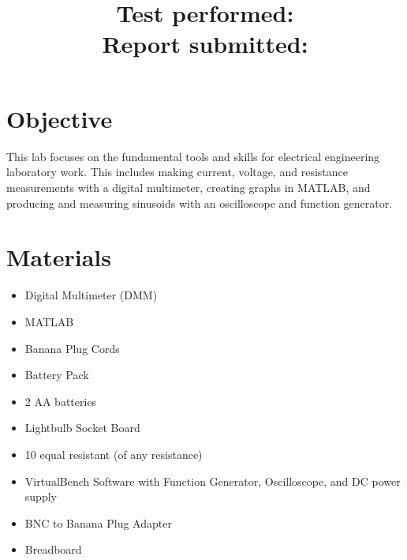 \documentclass[10pt]{article}
\title{
	\textbf{\courseTitle} \\
	\textbf{\documentTitle} \\
	\bigskip
	\textbf{\large{Test performed: \testDate}} \\
	\textbf{\large{Report submitted: \reportDate}} \\
	\bigskip
	\bigskip
}
\author{\documentAuthor}
\date{}
\begin{document}
	
	\maketitle
	
	\newpage
	
	\section{Objective}
	
	This lab focuses on the fundamental tools and skills for electrical engineering laboratory work. This includes making current, voltage, and resistance measurements with a digital multimeter, creating graphs in MATLAB, and producing and measuring sinusoids with an oscilloscope and function generator.  
	
	\medskip
	
	
	
	\section{Materials}
	
	\begin{itemize}
		\item Digital Multimeter (DMM)
		\item MATLAB
		\item Banana Plug Cords
		\item Battery Pack 
		\item 2 AA batteries
		\item Lightbulb Socket Board
		\item 10 equal resistant (of any resistance)
		\item VirtualBench Software with Function Generator, Oscilloscope, and DC power supply
		\item BNC to Banana Plug Adapter
		\item Breadboard
		
	\end{itemize}
	
\end{document}
